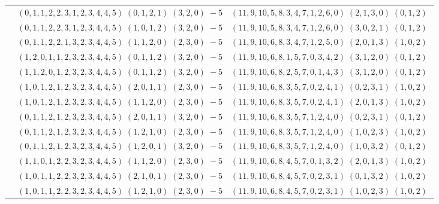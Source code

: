 \documentclass[11pt]{article}
\begin{document}
\begin{longtable}[l]{|c|c|c|}
 \cline{2-3} 
 & $(0 ,1 ,1 ,2 ,2 ,3 ,1 ,2 ,3 ,4 ,4 ,5) \;(0 ,1 ,2 ,1) \;(3 ,2 ,0) \;-5$ & $(11 ,9 ,10 ,5 ,8 ,3 ,4 ,7 ,1 ,2 ,6 ,0) \;(2 ,1 ,3 ,0) \;(0 ,1 ,2) \;$\\ 
 \cline{2-3} 
 & $(0 ,1 ,1 ,2 ,2 ,3 ,1 ,2 ,3 ,4 ,4 ,5) \;(1 ,0 ,1 ,2) \;(3 ,2 ,0) \;-5$ & $(11 ,9 ,10 ,5 ,8 ,3 ,4 ,7 ,1 ,2 ,6 ,0) \;(3 ,0 ,2 ,1) \;(0 ,1 ,2) \;$\\ 
 \cline{2-3} 
 & $(0 ,1 ,1 ,2 ,2 ,1 ,3 ,2 ,3 ,4 ,4 ,5) \;(1 ,1 ,2 ,0) \;(2 ,3 ,0) \;-5$ & $(11 ,9 ,10 ,6 ,8 ,3 ,4 ,7 ,1 ,2 ,5 ,0) \;(2 ,0 ,1 ,3) \;(1 ,0 ,2) \;$\\ 
 \cline{2-3} 
 & $(1 ,2 ,0 ,1 ,1 ,2 ,3 ,2 ,3 ,4 ,4 ,5) \;(0 ,1 ,1 ,2) \;(3 ,2 ,0) \;-5$ & $(11 ,9 ,10 ,6 ,8 ,1 ,5 ,7 ,0 ,3 ,4 ,2) \;(3 ,1 ,2 ,0) \;(0 ,1 ,2) \;$\\ 
 \cline{2-3} 
 & $(1 ,1 ,2 ,0 ,1 ,2 ,3 ,2 ,3 ,4 ,4 ,5) \;(0 ,1 ,1 ,2) \;(3 ,2 ,0) \;-5$ & $(11 ,9 ,10 ,6 ,8 ,2 ,5 ,7 ,0 ,1 ,4 ,3) \;(3 ,1 ,2 ,0) \;(0 ,1 ,2) \;$\\ 
 \cline{2-3} 
 & $(1 ,0 ,1 ,2 ,1 ,2 ,3 ,2 ,3 ,4 ,4 ,5) \;(2 ,0 ,1 ,1) \;(2 ,3 ,0) \;-5$ & $(11 ,9 ,10 ,6 ,8 ,3 ,5 ,7 ,0 ,2 ,4 ,1) \;(0 ,2 ,3 ,1) \;(1 ,0 ,2) \;$\\ 
 \cline{2-3} 
 & $(1 ,0 ,1 ,2 ,1 ,2 ,3 ,2 ,3 ,4 ,4 ,5) \;(1 ,1 ,2 ,0) \;(2 ,3 ,0) \;-5$ & $(11 ,9 ,10 ,6 ,8 ,3 ,5 ,7 ,0 ,2 ,4 ,1) \;(2 ,0 ,1 ,3) \;(1 ,0 ,2) \;$\\ 
 \cline{2-3} 
 & $(0 ,1 ,1 ,2 ,1 ,2 ,3 ,2 ,3 ,4 ,4 ,5) \;(2 ,0 ,1 ,1) \;(3 ,2 ,0) \;-5$ & $(11 ,9 ,10 ,6 ,8 ,3 ,5 ,7 ,1 ,2 ,4 ,0) \;(0 ,2 ,3 ,1) \;(0 ,1 ,2) \;$\\ 
 \cline{2-3} 
 & $(0 ,1 ,1 ,2 ,1 ,2 ,3 ,2 ,3 ,4 ,4 ,5) \;(1 ,2 ,1 ,0) \;(2 ,3 ,0) \;-5$ & $(11 ,9 ,10 ,6 ,8 ,3 ,5 ,7 ,1 ,2 ,4 ,0) \;(1 ,0 ,2 ,3) \;(1 ,0 ,2) \;$\\ 
 \cline{2-3} 
 & $(0 ,1 ,1 ,2 ,1 ,2 ,3 ,2 ,3 ,4 ,4 ,5) \;(1 ,2 ,0 ,1) \;(3 ,2 ,0) \;-5$ & $(11 ,9 ,10 ,6 ,8 ,3 ,5 ,7 ,1 ,2 ,4 ,0) \;(1 ,0 ,3 ,2) \;(0 ,1 ,2) \;$\\ 
 \cline{2-3} 
 & $(1 ,1 ,0 ,1 ,2 ,2 ,3 ,2 ,3 ,4 ,4 ,5) \;(1 ,1 ,2 ,0) \;(2 ,3 ,0) \;-5$ & $(11 ,9 ,10 ,6 ,8 ,4 ,5 ,7 ,0 ,1 ,3 ,2) \;(2 ,0 ,1 ,3) \;(1 ,0 ,2) \;$\\ 
 \cline{2-3} 
 & $(1 ,0 ,1 ,1 ,2 ,2 ,3 ,2 ,3 ,4 ,4 ,5) \;(2 ,1 ,0 ,1) \;(2 ,3 ,0) \;-5$ & $(11 ,9 ,10 ,6 ,8 ,4 ,5 ,7 ,0 ,2 ,3 ,1) \;(0 ,1 ,3 ,2) \;(1 ,0 ,2) \;$\\ 
 \cline{2-3} 
 & $(1 ,0 ,1 ,1 ,2 ,2 ,3 ,2 ,3 ,4 ,4 ,5) \;(1 ,2 ,1 ,0) \;(2 ,3 ,0) \;-5$ & $(11 ,9 ,10 ,6 ,8 ,4 ,5 ,7 ,0 ,2 ,3 ,1) \;(1 ,0 ,2 ,3) \;(1 ,0 ,2) \;$\\ 

\end{longtable}
\end{document}
